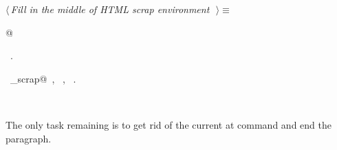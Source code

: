 \documentclass{report}
\begin{document}
\begin{flushleft} \small
\begin{minipage}{\linewidth} \label{scrap105}
$\langle\,${\it Fill in the middle of HTML scrap environment}\nobreak\ {\footnotesize {}}$\,\rangle\equiv$
\vspace{-1ex}
\begin{list}{}{} \item
\mbox{}@{\NWsep}
\end{list}
\vspace{-1ex}
\footnotesize\addtolength{\baselineskip}{-1ex}
\begin{list}{}{\setlength{\itemsep}{-\parsep}\setlength{\itemindent}{-\leftmargin}}
\item \NWtxtMacroRefIn\ .
\end{list}
\vspace{-2ex}
\footnotesize\addtolength{\baselineskip}{-1ex}
\begin{list}{}{\setlength{\itemsep}{-\parsep}\setlength{\itemindent}{-\leftmargin}}
\item \NWtxtIdentsUsed\nobreak\  \verb@copy_scrap@\nobreak\ , \verb@fputs@\nobreak\ , \verb@TRUE@\nobreak\ .\end{list}
\end{minipage}\\[4ex]
\end{flushleft}
The only task remaining is to get rid of the current at command and
end the paragraph.
\end{document}
